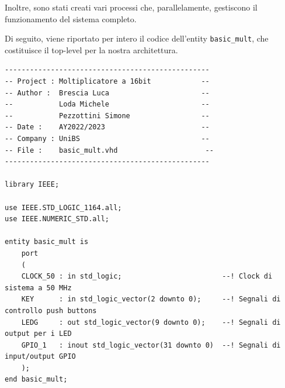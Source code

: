 \documentclass[titlepage]{report}
\begin{document}
		Inoltre, sono stati creati vari processi che, parallelamente, gestiscono il funzionamento del sistema completo.

		Di seguito, viene riportato per intero il codice dell'entity \texttt{basic\_mult}, che costituisce il top-level per la nostra architettura.

		\begin{lstlisting}[caption={Top level implementato per la nostra architettura}, label={lst:mul16_process}]
-------------------------------------------------
-- Project : Moltiplicatore a 16bit            --
-- Author :  Brescia Luca                      -- 
--           Loda Michele                      --
--           Pezzottini Simone                 --
-- Date : 	 AY2022/2023                       --
-- Company : UniBS                             --
-- File : 	 basic_mult.vhd       		        --
-------------------------------------------------

library IEEE;

use IEEE.STD_LOGIC_1164.all;
use IEEE.NUMERIC_STD.all;

entity basic_mult is
	port
	(
	CLOCK_50 : in std_logic;                        --! Clock di sistema a 50 MHz
	KEY      : in std_logic_vector(2 downto 0);     --! Segnali di controllo push buttons
	LEDG     : out std_logic_vector(9 downto 0);    --! Segnali di output per i LED
	GPIO_1   : inout std_logic_vector(31 downto 0)  --! Segnali di input/output GPIO
	);
end basic_mult;


\end{lstlisting}
\end{document}
